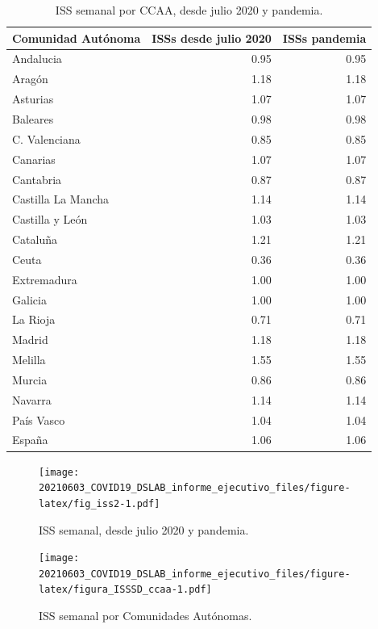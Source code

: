 \documentclass[
  11pt,
]{article}
\begin{document}
\begin{table}[!h]

\caption{\label{tab:tabla2}ISS semanal por CCAA, desde julio 2020 y pandemia.}
\centering
\fontsize{9}{11}\selectfont
\begin{tabular}[t]{l|r|r}
\hline
Comunidad Autónoma & ISSs desde julio 2020 & ISSs pandemia\\
\hline
Andalucia & 0.95 & 0.95\\
\hline
Aragón & 1.18 & 1.18\\
\hline
Asturias & 1.07 & 1.07\\
\hline
Baleares & 0.98 & 0.98\\
\hline
C. Valenciana & 0.85 & 0.85\\
\hline
Canarias & 1.07 & 1.07\\
\hline
Cantabria & 0.87 & 0.87\\
\hline
Castilla La Mancha & 1.14 & 1.14\\
\hline
Castilla y León & 1.03 & 1.03\\
\hline
Cataluña & 1.21 & 1.21\\
\hline
Ceuta & 0.36 & 0.36\\
\hline
Extremadura & 1.00 & 1.00\\
\hline
Galicia & 1.00 & 1.00\\
\hline
La Rioja & 0.71 & 0.71\\
\hline
Madrid & 1.18 & 1.18\\
\hline
Melilla & 1.55 & 1.55\\
\hline
Murcia & 0.86 & 0.86\\
\hline
Navarra & 1.14 & 1.14\\
\hline
País Vasco & 1.04 & 1.04\\
\hline
España & 1.06 & 1.06\\
\hline
\end{tabular}
\end{table}

\begin{figure}
\centering
\texttt{[image: 20210603\_COVID19\_DSLAB\_informe\_ejecutivo\_files/figure-latex/fig\_iss2-1.pdf]}
\caption{\label{fig:fig_iss2} ISS semanal, desde julio 2020 y pandemia.}
\end{figure}

\begin{figure}
\centering
\texttt{[image: 20210603\_COVID19\_DSLAB\_informe\_ejecutivo\_files/figure-latex/figura\_ISSSD\_ccaa-1.pdf]}
\caption{\label{fig:figura_ISSSD_ccaa} ISS semanal por Comunidades
Autónomas.}
\end{figure}
\end{document}
